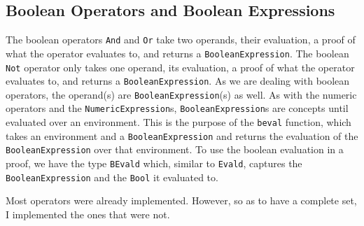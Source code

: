     \subsection{Boolean Operators and Boolean Expressions}
        The boolean operators \texttt{And} and \texttt{Or} take two operands, their evaluation, a proof of what the operator evaluates to, and returns a \texttt{BooleanExpression}. The boolean \texttt{Not} operator only takes one operand, its evaluation, a proof of what the operator evaluates to, and returns a \texttt{BooleanExpression}. As we are dealing with boolean operators, the operand(s) are \texttt{BooleanExpression}(s) as well.
        As with the numeric operators and the \texttt{NumericExpression}s, \texttt{BooleanExpression}s are concepts until evaluated over an environment. This is the purpose of the \texttt{beval} function, which takes an environment and a \texttt{BooleanExpression} and returns the evaluation of the \texttt{BooleanExpression} over that environment. To use the boolean evaluation in a proof, we have the type \texttt{BEvald} which, similar to \texttt{Evald}, captures the \texttt{BooleanExpression} and the \texttt{Bool} it evaluated to.
        \\\par
        
        Most operators were already implemented. However, so as to have a complete set, I implemented the ones that were not.

